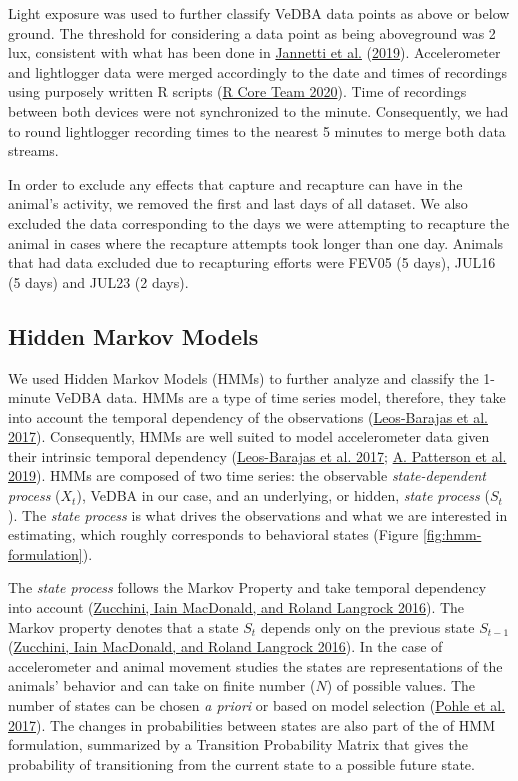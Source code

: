 \documentclass[english,msc,numbers,hidelinks]{coppe}
\begin{document}
  Light exposure was used to further classify VeDBA data points as above or below ground. The threshold for considering a data point as being aboveground was 2 lux, consistent with what has been done in \protect\hyperlink{ref-jannetti2019}{Jannetti et al.} (\protect\hyperlink{ref-jannetti2019}{2019}). Accelerometer and lightlogger data were merged accordingly to the date and times of recordings using purposely written R scripts (\protect\hyperlink{ref-rcoreteam2020}{R Core Team 2020}). Time of recordings between both devices were not synchronized to the minute. Consequently, we had to round lightlogger recording times to the nearest 5 minutes to merge both data streams.

  In order to exclude any effects that capture and recapture can have in the animal's activity, we removed the first and last days of all dataset. We also excluded the data corresponding to the days we were attempting to recapture the animal in cases where the recapture attempts took longer than one day. Animals that had data excluded due to recapturing efforts were FEV05 (5 days), JUL16 (5 days) and JUL23 (2 days).

  \hypertarget{hidden-markov-models}{%
  \subsection{Hidden Markov Models}\label{hidden-markov-models}}

  We used Hidden Markov Models (HMMs) to further analyze and classify the 1-minute VeDBA data. HMMs are a type of time series model, therefore, they take into account the temporal dependency of the observations (\protect\hyperlink{ref-leosbarajas2017}{Leos-Barajas et al. 2017}). Consequently, HMMs are well suited to model accelerometer data given their intrinsic temporal dependency (\protect\hyperlink{ref-leosbarajas2017}{Leos-Barajas et al. 2017}; \protect\hyperlink{ref-patterson2019}{A. Patterson et al. 2019}). HMMs are composed of two time series: the observable \emph{state-dependent process} (\(X_t\)), VeDBA in our case, and an underlying, or hidden, \emph{state process} (\(S_t\)). The \emph{state process} is what drives the observations and what we are interested in estimating, which roughly corresponds to behavioral states (Figure \ref{fig:hmm-formulation}).

  The \emph{state process} follows the Markov Property and take temporal dependency into account (\protect\hyperlink{ref-zucchini2016}{Zucchini, Iain MacDonald, and Roland Langrock 2016}). The Markov property denotes that a state \(S_t\) depends only on the previous state \(S_{t-1}\) (\protect\hyperlink{ref-zucchini2016}{Zucchini, Iain MacDonald, and Roland Langrock 2016}). In the case of accelerometer and animal movement studies the states are representations of the animals' behavior and can take on finite number (\(N\)) of possible values. The number of states can be chosen \emph{a priori} or based on model selection (\protect\hyperlink{ref-pohle2017}{Pohle et al. 2017}). The changes in probabilities between states are also part of the of HMM formulation, summarized by a Transition Probability Matrix that gives the probability of transitioning from the current state to a possible future state.
\end{document}
